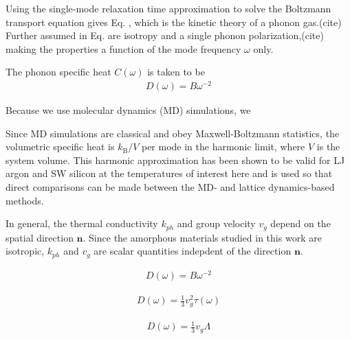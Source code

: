 \documentclass[aps,prb,twocolumn,superscriptaddress,footinbib,amsmath,amssymb,floatfix]{revtex4}
\begin{document}
Using the single-mode relaxation
time approximation \cite{ziman_electrons_2001} to solve 
the Boltzmann transport equation gives Eq. , which is the 
kinetic theory of a phonon gas.(cite) Further assumed in Eq. 
are isotropy and a single phonon 
polarization,(cite) making the  
properties a function of the mode frequency $\omega$ only. 

The phonon specific heat $C(\omega)$ is taken to be 
\begin{equation}\label{EQ:DB}
\begin{split}
D(\omega) = B\omega^{-2} 
\end{split}
\end{equation}

Because we use molecular dynamics (MD) simulations, we

Since MD simulations are classical 
and obey Maxwell-Boltzmann 
statistics,\cite{mcquarrie_statistical_2000} the volumetric 
specific heat is $k_{\text{B}}/V$ per mode in the harmonic limit, where $V$ 
is the system volume. This harmonic approximation has been shown to be valid 
for LJ argon and SW silicon at the temperatures of interest here
\cite{mcgaughey_quantitative_2004,goicochea_thermal_2010} 
and is used so that direct comparisons can be made between 
the MD- and lattice dynamics-based methods.

In general, the thermal conductivity $k_{ph}$ and group velocity 
$v_{g}$ depend on the spatial direction $\mathbf{n}$. 
Since the amorphous materials studied in this work are isotropic, 
$k_{ph}$ and $v_{g}$ are scalar quantities indepdent of the direction 
$\mathbf{n}$. 

\begin{equation}\label{EQ:DB}
\begin{split}
D(\omega) = B\omega^{-2} 
\end{split}
\end{equation}

\begin{equation}\label{EQ:Dtau}
\begin{split}
D(\omega) = \frac{1}{3}v^2_g\tau(\omega)
\end{split}
\end{equation}



\begin{equation}\label{EQ:DLambda}
\begin{split}
D(\omega) = \frac{1}{3}v_g \Lambda
\end{split}
\end{equation}
\end{document}
